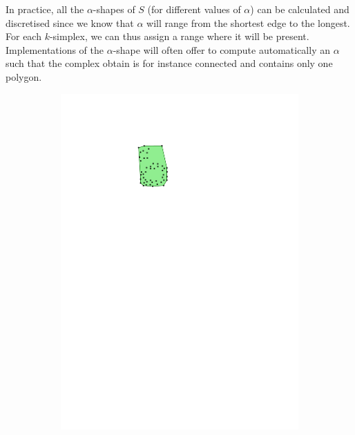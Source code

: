 In practice, all the $\alpha$-shapes of $S$ (for different values of $\alpha$) can be calculated and discretised since we know that $\alpha$ will range from the shortest edge to the longest.
For each $k$-simplex, we can thus assign a range where it will be present.
Implementations of the $\alpha$-shape will often offer to compute automatically an $\alpha$ such that the complex obtain is for instance connected and contains only one polygon.
\begin{figure}
  \centering
  \begin{subfigure}[b]{0.15\linewidth}
    \centering
    \includegraphics[page=1,width=\textwidth]{figs/alphashape.pdf}
    \caption{}\label{fig:aplhashape:a}
  \end{subfigure}
  \qquad 
  \begin{subfigure}[b]{0.15\linewidth}
    \centering

\end{subfigure}
\end{figure}
